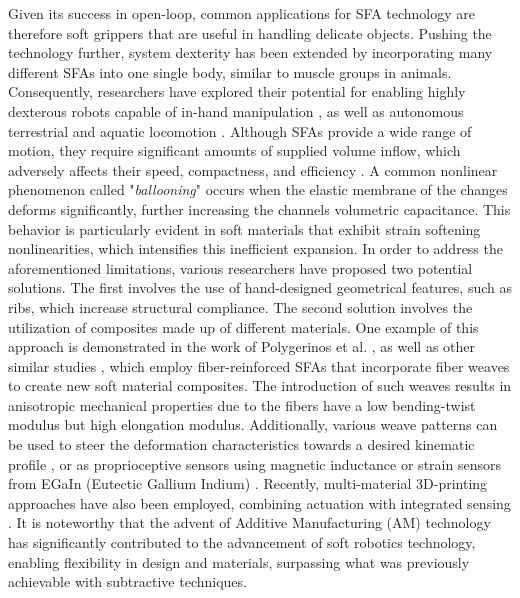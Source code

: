 Given its success in open-loop, common applications for SFA technology are therefore soft grippers \cite{Galloway2016,Hughes2016Nov,Ansari2022Sep,Teleshev1981} that are useful in handling delicate objects. Pushing the technology further, system dexterity has been extended by incorporating many different SFAs into one single body, similar to muscle groups in animals. Consequently, researchers have explored their potential for enabling highly dexterous robots capable of in-hand manipulation \cite{Suzumori1991,Graule2022}, as well as autonomous terrestrial and aquatic locomotion \cite{Choi2011,Katzschmann2018,Drotman2017,Suzumori1992}. Although SFAs provide a wide range of motion, they require significant amounts of supplied volume inflow, which adversely affects their speed, compactness, and efficiency \cite{Overvelde2015Sep,Rus2015,Xavier2022Jun}. A common nonlinear phenomenon called "\emph{ballooning}" occurs when the elastic membrane of the changes deforms significantly, further increasing the channels volumetric capacitance. This behavior is particularly evident in soft materials that exhibit strain softening nonlinearities, which intensifies this inefficient expansion. In order to address the aforementioned limitations, various researchers have proposed two potential solutions. The first involves the use of hand-designed geometrical features, such as ribs, which increase structural compliance. The second solution involves the utilization of composites made up of different materials. One example of this approach is demonstrated in the work of Polygerinos et al. \cite{Polygerinos2015,Polygerinos2013}, as well as other similar studies \cite{Fras2018Oct,Suzumori1991,Cianchetti2013Nov,Cianchetti2013Nov}, which employ fiber-reinforced SFAs that incorporate fiber weaves to create new soft material composites. The introduction of such weaves results in anisotropic mechanical properties due to the fibers have a low bending-twist modulus but high elongation modulus. Additionally, various weave patterns can be used to steer the deformation characteristics towards a desired kinematic profile \cite{Kim2019Aug, Connolly2017Jan}, or as proprioceptive sensors using magnetic inductance \cite{Felt2019Feb, Felt2015Oct} or strain sensors from EGaIn (Eutectic Gallium Indium) \cite{Park2012}. Recently, multi-material 3D-printing approaches have also been employed, combining actuation with integrated sensing \cite{Wolterink2022Oct, Zhou2021Apr}. It is noteworthy that the advent of Additive Manufacturing (AM) technology has significantly contributed to the advancement of soft robotics technology, enabling flexibility in design and materials, surpassing what was previously achievable with subtractive techniques.

